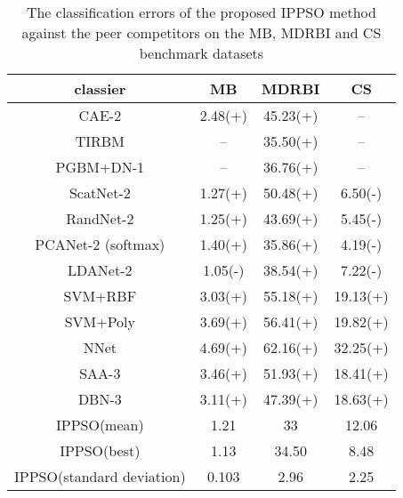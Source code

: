 \documentclass[conference]{IEEEtran}
\begin{document}
\begin{table}[!t]
	\renewcommand{\arraystretch}{1.3}
	\caption{The classification errors of the proposed IPPSO method against the peer competitors on the MB, MDRBI and CS benchmark datasets}
	\label{table:ResultComparison}
	\centering
	\begin{tabular}{|c|c|c|c|}
		\hline
		classier & MB & MDRBI & CS\\
		\hline
		CAE-2 & 2.48(+) & 45.23(+) & --\\
		\hline
		TIRBM & -- & 35.50(+) & --\\
		\hline
		PGBM+DN-1 & -- & 36.76(+) & --\\
		\hline
		ScatNet-2 & 1.27(+) & 50.48(+) & 6.50(-)\\
		\hline
		RandNet-2 & 1.25(+) & 43.69(+) & 5.45(-)\\
		\hline
		PCANet-2 (softmax)  & 1.40(+) & 35.86(+) & 4.19(-)\\
		\hline
		LDANet-2 & 1.05(-) & 38.54(+) & 7.22(-)\\
		\hline
		SVM+RBF & 3.03(+) & 55.18(+) & 19.13(+)\\
		\hline
		SVM+Poly & 3.69(+) & 56.41(+) & 19.82(+)\\
		\hline
		NNet & 4.69(+) & 62.16(+) & 32.25(+)\\
		\hline
		SAA-3 & 3.46(+) & 51.93(+) & 18.41(+)\\
		\hline
		DBN-3  & 3.11(+) & 47.39(+) & 18.63(+)\\
		\hline
		IPPSO(mean) & 1.21 & 33 & 12.06\\
		\hline
		IPPSO(best) & 1.13 & 34.50 & 8.48\\
		\hline
		IPPSO(standard deviation) & 0.103 & 2.96 & 2.25\\
		\hline
	\end{tabular}
\end{table}

%
\end{document}
